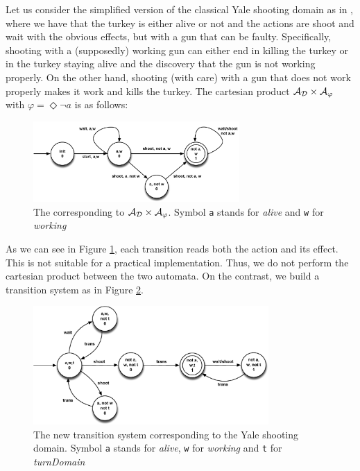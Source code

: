 \begin{example}\label{ex:yale-scenario}
Let us consider the simplified version of the classical Yale shooting domain \citep{hanks1986default} as in \cite{de2018automata}, where we have that the turkey is either alive or not and the actions are shoot and wait with the obvious effects, but with a gun that can be faulty. Specifically, shooting with a (supposedly) working gun can either end in killing the turkey or in the turkey staying alive and the discovery that the gun is not working properly. On the other hand, shooting (with care) with a gun that does not work properly makes it work and kills the turkey. The cartesian product $\mathcal{A}_{\mathcal{D}} \times \mathcal{A}_\varphi$ with $\varphi = \Diamond\lnot a$ is as follows:

\begin{figure}[h]
\centering
\includegraphics[width=0.7\textwidth]{images/cartesian-prod}
\caption{The \DFA corresponding to $\mathcal{A}_{\mathcal{D}} \times \mathcal{A}_\varphi$. Symbol \texttt{a} stands for \textit{alive} and \texttt{w} for \textit{working}} 
\label{fig:dfa-game}
\end{figure}

\noindent As we can see in Figure \ref{fig:dfa-game}, each transition reads both the action and its effect. This is not suitable for a practical implementation. Thus, we do not perform the cartesian product between the two automata. On the contrast, we build a transition system as in Figure \ref{fig:yale-our-sol}.

\begin{figure}[h]
\centering
\includegraphics[width=0.8\textwidth]{images/yale-our-sol}
\caption{The new transition system corresponding to the Yale shooting domain. Symbol \texttt{a} stands for \textit{alive}, \texttt{w} for \textit{working} and \texttt{t} for \textit{turnDomain}} 
\label{fig:yale-our-sol}
\end{figure}
\end{example}


